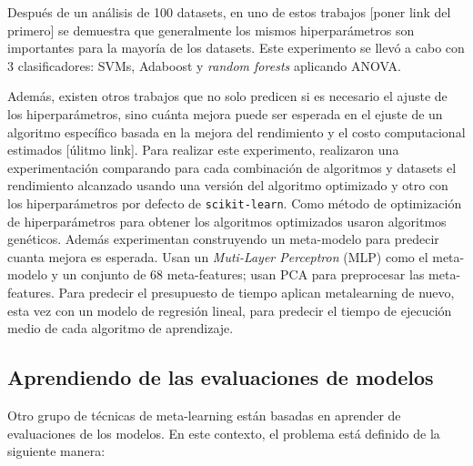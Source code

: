 Después de un análisis de 100 datasets, en uno de estos trabajos [poner link del primero] se demuestra que generalmente los mismos hiperparámetros son importantes para la mayoría de los datasets. Este experimento se llevó a cabo con 3 clasificadores: SVMs, Adaboost y \textit{random forests} aplicando ANOVA.

Además, existen otros trabajos que no solo predicen si es necesario el ajuste de los hiperparámetros, sino cuánta mejora puede ser esperada en el ejuste de un algoritmo específico basada en la mejora del rendimiento y el costo computacional estimados [úlitmo link]. Para realizar este experimento, realizaron una experimentación comparando para cada combinación de algoritmos y datasets el rendimiento alcanzado usando una versión del algoritmo optimizado y otro con los hiperparámetros por defecto de \texttt{scikit-learn}. Como método de optimización de hiperparámetros para obtener los algoritmos optimizados usaron algoritmos genéticos. Además experimentan construyendo un meta-modelo para predecir cuanta mejora es esperada. Usan un \textit{Muti-Layer Perceptron} (MLP) como el meta-modelo y un conjunto de 68 meta-features; usan PCA para preprocesar las meta-features. Para predecir el presupuesto de tiempo aplican metalearning de nuevo, esta vez con un modelo de regresión lineal, para predecir el tiempo de ejecución medio de cada algoritmo de aprendizaje.


%

\subsection{Aprendiendo de las evaluaciones de modelos}\label{subsec:mtl_automl_evaluations}

Otro grupo de técnicas de meta-learning están basadas en aprender de evaluaciones de los modelos. En este contexto, el problema está definido de la siguiente manera:

